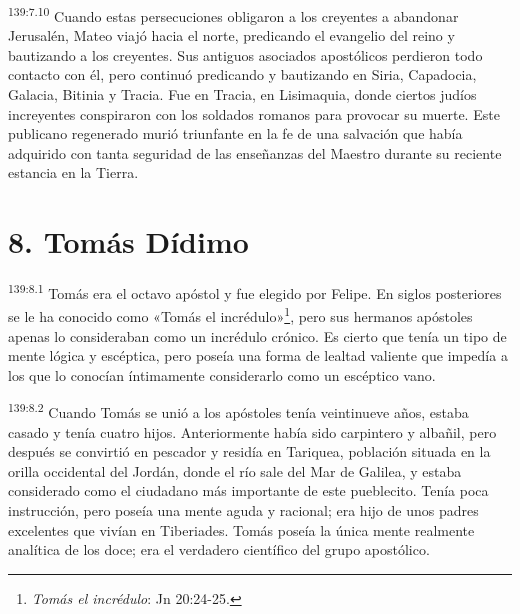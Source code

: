 \par
\textsuperscript{139:7.10} Cuando estas persecuciones obligaron a los creyentes a abandonar Jerusalén, Mateo viajó hacia el norte, predicando el evangelio del reino y bautizando a los creyentes. Sus antiguos asociados apostólicos perdieron todo contacto con él, pero continuó predicando y bautizando en Siria, Capadocia, Galacia, Bitinia y Tracia. Fue en Tracia, en Lisimaquia, donde ciertos judíos increyentes conspiraron con los soldados romanos para provocar su muerte. Este publicano regenerado murió triunfante en la fe de una salvación que había adquirido con tanta seguridad de las enseñanzas del Maestro durante su reciente estancia en la Tierra.

\section*{8. Tomás Dídimo}
\par
\textsuperscript{139:8.1} Tomás era el octavo apóstol y fue elegido por Felipe. En siglos posteriores se le ha conocido como «Tomás el incrédulo»\footnote{\textit{Tomás el incrédulo}: Jn 20:24-25.}, pero sus hermanos apóstoles apenas lo consideraban como un incrédulo crónico. Es cierto que tenía un tipo de mente lógica y escéptica, pero poseía una forma de lealtad valiente que impedía a los que lo conocían íntimamente considerarlo como un escéptico vano.

\par
\textsuperscript{139:8.2} Cuando Tomás se unió a los apóstoles tenía veintinueve años, estaba casado y tenía cuatro hijos. Anteriormente había sido carpintero y albañil, pero después se convirtió en pescador y residía en Tariquea, población situada en la orilla occidental del Jordán, donde el río sale del Mar de Galilea, y estaba considerado como el ciudadano más importante de este pueblecito. Tenía poca instrucción, pero poseía una mente aguda y racional; era hijo de unos padres excelentes que vivían en Tiberiades. Tomás poseía la única mente realmente analítica de los doce; era el verdadero científico del grupo apostólico.

